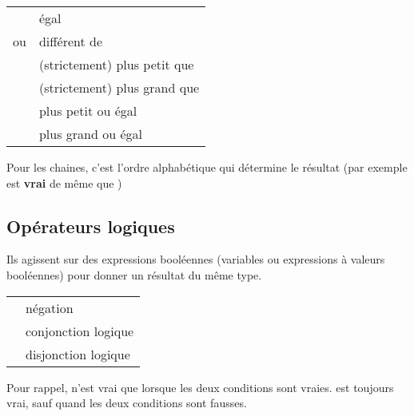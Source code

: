 			\begin{center}
			\tablehead{}
			\begin{supertabular}{m{2cm}|m{11cm}}
			\raggedleft  \textstyleCodeInsr{=} & égal\\
			\raggedleft  \textstyleCodeInsr{{\textless}{\textgreater}}
				ou \textstyleCodeInsr{${\neq}$} &  différent de\\
			\raggedleft  \textstyleCodeInsr{\textless} & (strictement) plus petit que\\
			\raggedleft  \textstyleCodeInsr{\textgreater} & (strictement) plus grand que\\
			\raggedleft  \textstyleCodeInsr{${\leq}$} & plus petit ou égal\\
			\raggedleft  \textstyleCodeInsr{${\geq}$} & plus grand ou égal\\
			\end{supertabular}
			\end{center}
	
			Pour les chaines, c’est l’ordre alphabétique qui
			détermine le résultat (par exemple
			 est \textbf{vrai} de même que
			\textstyleCodeInsr{${\leq}$})
			
	
		\subsection{Opérateurs logiques}
	
			Ils agissent sur des expressions booléennes (variables ou expressions à
			valeurs booléennes) pour donner un résultat du même type.
	
			\begin{center}
			\tablehead{}
			\begin{supertabular}{m{1cm}|m{12cm}}
			\raggedleft  {} & négation\\
			\raggedleft  {} & conjonction logique\\
			\raggedleft  {} & disjonction logique\\
			\end{supertabular}
			\end{center}
	
			Pour rappel,  n’est vrai que lorsque
			les deux conditions sont vraies.  est
			toujours vrai, sauf quand les deux conditions sont fausses.
	
